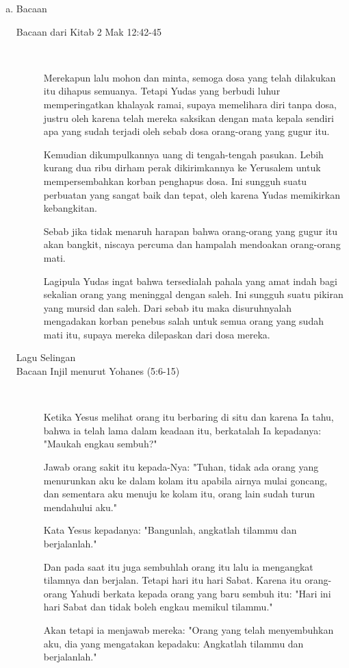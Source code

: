 \documentclass[a5paper,titlepage,12pt]{scrbook}
\begin{document}
\begin{itemize}
\begin{enumerate}[a.]
		\item Bacaan
			\begin{description}
				\item [Bacaan dari Kitab  2 Mak 12:42-45] 
					{~}

						Merekapun lalu mohon dan minta, semoga dosa yang telah dilakukan itu dihapus semuanya. Tetapi Yudas yang berbudi luhur memperingatkan khalayak ramai, supaya memelihara diri tanpa dosa, justru oleh karena telah mereka saksikan dengan mata kepala sendiri apa yang sudah terjadi oleh sebab dosa orang-orang yang gugur itu.

Kemudian dikumpulkannya uang di tengah-tengah pasukan. Lebih kurang dua ribu dirham perak dikirimkannya ke Yerusalem untuk mempersembahkan korban penghapus dosa. Ini sungguh suatu perbuatan yang sangat baik dan tepat, oleh karena Yudas memikirkan kebangkitan.

Sebab jika tidak menaruh harapan bahwa orang-orang yang gugur itu akan bangkit, niscaya percuma dan hampalah mendoakan orang-orang mati.

Lagipula Yudas ingat bahwa tersedialah pahala yang amat indah bagi sekalian orang yang meninggal dengan saleh. Ini sungguh suatu pikiran yang mursid dan saleh. Dari sebab itu maka disuruhnyalah mengadakan korban penebus salah untuk semua orang yang sudah mati itu, supaya mereka dilepaskan dari dosa mereka. 

				\item [Lagu Selingan]

				\item [Bacaan Injil menurut Yohanes (5:6-15)]
				{~}
				
				Ketika Yesus melihat orang itu berbaring di situ dan karena Ia tahu, bahwa ia telah lama dalam keadaan itu, berkatalah Ia kepadanya: "Maukah engkau sembuh?"

Jawab orang sakit itu kepada-Nya: "Tuhan, tidak ada orang yang menurunkan aku ke dalam kolam itu apabila airnya mulai goncang, dan sementara aku menuju ke kolam itu, orang lain sudah turun mendahului aku."

Kata Yesus kepadanya: "Bangunlah, angkatlah tilammu dan berjalanlah."

Dan pada saat itu juga sembuhlah orang itu lalu ia mengangkat tilamnya dan berjalan. Tetapi hari itu hari Sabat.
Karena itu orang-orang Yahudi berkata kepada orang yang baru sembuh itu: "Hari ini hari Sabat dan tidak boleh engkau memikul tilammu."

Akan tetapi ia menjawab mereka: "Orang yang telah menyembuhkan aku, dia yang mengatakan kepadaku: Angkatlah tilammu dan berjalanlah."


\end{description}
\end{enumerate}
\end{itemize}
\end{document}
